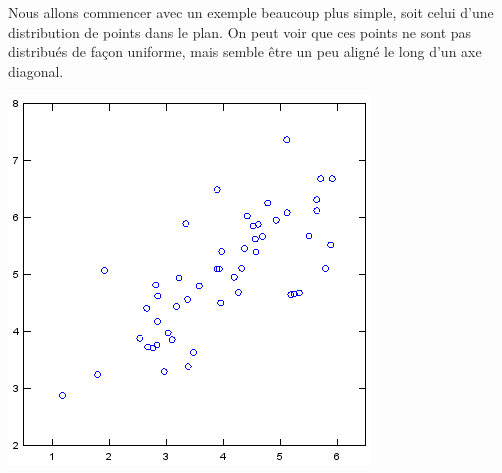 \begin{adjmulticols}{1}{0in}{-2in}

\begin{center}
\begin{minipage}{0.9\textwidth}
Nous allons commencer avec un exemple beaucoup plus simple, soit celui d'une distribution de
points dans le plan.
On peut voir que ces points ne sont pas distribués de façon
uniforme, mais semble être un peu aligné le long d'un axe
diagonal.
\end{minipage}
\hfill
\begin{minipage}{0.45\textwidth}
\includegraphics[width=\linewidth]{./images/pca_points}
\end{minipage}
\end{center}



\end{adjmulticols}
